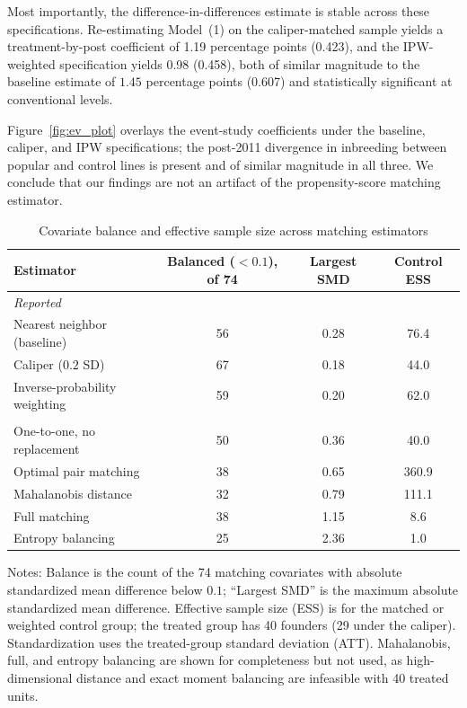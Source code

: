 \documentclass[12pt,letterpaper]{article}
\begin{document}
Most importantly, the difference-in-differences estimate is stable across these specifications. Re-estimating Model~(1) on the caliper-matched sample yields a treatment-by-post coefficient of 1.19 percentage points (0.423), and the IPW-weighted specification yields 0.98 (0.458), both of similar magnitude to the baseline estimate of $1.45$ percentage points (0.607) and statistically significant at conventional levels.

Figure~\ref{fig:ev_plot} overlays the event-study coefficients under the baseline, caliper, and IPW specifications; the post-2011 divergence in inbreeding between popular and control lines is present and of similar magnitude in all three. We conclude that our findings are not an artifact of the propensity-score matching estimator.
 
\begin{table}[htbp]
\centering
\caption{Covariate balance and effective sample size across matching estimators}
\label{tab:altmatch}
\begin{tabular}{lccc}
\toprule
Estimator & Balanced ($<0.1$), of 74 & Largest SMD & Control ESS \\
\midrule
\multicolumn{4}{l}{\textit{Reported}} \\
\quad Nearest neighbor (baseline) & 56 & 0.28 & 76.4 \\
\quad Caliper ($0.2$ SD)          & 67 & 0.18 & 44.0 \\
\quad Inverse-probability weighting & 59 & 0.20 & 62.0 \\
\addlinespace
\multicolumn{4}{l}{\textit{Infeasible at 74 covariates / 40 treated (not reported)}} \\
\quad One-to-one, no replacement  & 50 & 0.36 & 40.0 \\
\quad Optimal pair matching       & 38 & 0.65 & 360.9 \\
\quad Mahalanobis distance        & 32 & 0.79 & 111.1 \\
\quad Full matching               & 38 & 1.15 & 8.6 \\
\quad Entropy balancing           & 25 & 2.36 & 1.0 \\
\bottomrule
\end{tabular}
\begin{minipage}{0.92\textwidth}
\footnotesize \vspace{4pt} Notes: Balance is the count of the 74 matching covariates with
absolute standardized mean difference below $0.1$; ``Largest SMD'' is the maximum absolute
standardized mean difference. Effective sample size (ESS) is for the matched or weighted
control group; the treated group has 40 founders (29 under the caliper). Standardization
uses the treated-group standard deviation (ATT). Mahalanobis, full, and entropy balancing
are shown for completeness but not used, as high-dimensional distance and exact moment
balancing are infeasible with 40 treated units.
\end{minipage}
\end{table}
\end{document}
